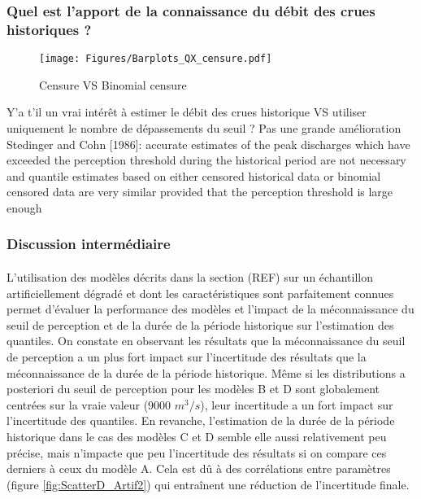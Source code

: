 \documentclass[11pt]{article}
\begin{document}
\FloatBarrier

	\subsubsection{Quel est l'apport de la connaissance du débit des crues historiques ?}


	\begin{figure}[h]
		\centering
		\texttt{[image: Figures/Barplots\_QX\_censure.pdf]}
		\caption{Censure VS Binomial censure}
		\label{fig:CensureArtif}
	\end{figure}
	
	
	Y'a t'il un vrai intérêt à estimer le débit des crues historique VS utiliser uniquement le nombre de dépassements du seuil ? Pas une grande amélioration\\
	Stedinger and Cohn [1986]: accurate estimates of the peak discharges which have exceeded the perception threshold during the historical period are not necessary and quantile estimates based on either censored historical data or binomial censored data are very similar provided that the perception threshold is large enough

	\subsubsection{Discussion intermédiaire}
	
	\paragraph{} L'utilisation des modèles décrits dans la section (REF) sur un échantillon artificiellement dégradé et dont les caractéristiques sont parfaitement connues permet d'évaluer la performance des modèles et l'impact de la méconnaissance du seuil de perception et de la durée de la période historique sur l'estimation des quantiles. On constate en observant les résultats que la méconnaissance du seuil de perception a un plus fort impact sur l'incertitude des résultats que la méconnaissance de la durée de la période historique. Même si les distributions a posteriori du seuil de perception pour les modèles B et D sont globalement centrées sur la vraie valeur (9000 $m^3/s$), leur incertitude a un fort impact sur l'incertitude des quantiles. En revanche, l'estimation de la durée de la période historique dans le cas des modèles C et D semble elle aussi relativement peu précise, mais n'impacte que peu l'incertitude des résultats si on compare ces derniers à ceux du modèle A. Cela est dû à des corrélations entre paramètres (figure \ref{fig:ScatterD_Artif2}) qui entraînent une réduction de l'incertitude finale.
	 
\end{document}
